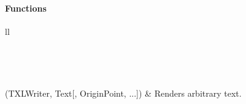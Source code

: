\documentclass[letterpaper,10pt,english]{sphinxmanual}
\begin{document}
\paragraph{Functions}
\label{Chapters/PythonModuleReference/ShapeLibrary/TXLWizard.ShapeLibrary.Label:functions}
\begin{longtable}{ll}
\hline
\endfirsthead

%
{{}} \\
\hline
\endhead

\hline {} \\ \hline
\endfoot

\endlastfoot


{\hyperref[Chapters/PythonModuleReference/ShapeLibrary/TXLWizard.ShapeLibrary.Label:TXLWizard.ShapeLibrary.Label.GetLabel]{}}(TXLWriter, Text{[}, OriginPoint, ...{]})
 & 
Renders arbitrary text.
\\
\hline\end{longtable}

\end{document}

